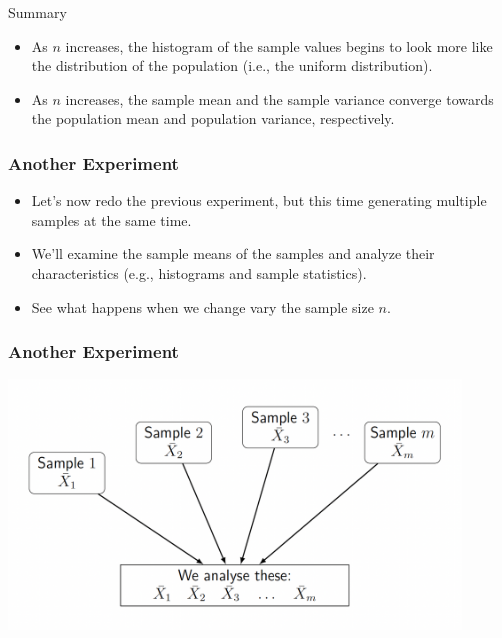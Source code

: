 \documentclass[12pt]{beamer}
\begin{document}
\begin{frame}{Summary}
	\begin{itemize}[label={\color{blue}$\blacktriangleright$}]
		\item As $n$ increases, the histogram of the sample values begins to look more like the distribution of the population (i.e., the uniform distribution).
		\item {\color{red}As $n$ increases, the sample mean and the sample variance converge towards the population mean and population variance, respectively.}
	\end{itemize}
\end{frame}
\begin{frame}
	\frametitle{Another Experiment}
	\begin{itemize}[label={\color{blue}$\blacktriangleright$}]
		\item Let's now redo the previous experiment, but this time generating multiple samples at the same time.
		\item We'll examine the sample means of the samples and analyze their characteristics (e.g., histograms and sample statistics).
		\item See what happens when we change vary the sample size $n$.
	\end{itemize}
	
\end{frame}
\begin{frame}
	\frametitle{Another Experiment}
	
\centering
\includegraphics[width=12cm]{anther.png}
	
\end{frame}
\end{document}
